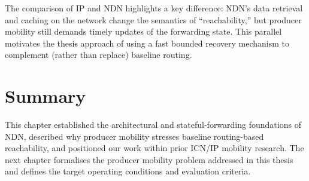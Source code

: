 The comparison of IP and NDN highlights a key difference: NDN’s data retrieval and caching on the network change the semantics of “reachability,” but producer mobility still demands timely updates of the forwarding state. This parallel motivates the thesis approach of using a fast bounded recovery mechanism to complement (rather than replace) baseline routing.


\section{Summary}
\label{sec:background:summary}

This chapter established the architectural and stateful-forwarding foundations of NDN, described why producer mobility stresses baseline routing-based reachability, and positioned our work within prior ICN/IP mobility research.
The next chapter formalises the producer mobility problem addressed in this thesis and defines the target operating conditions and evaluation criteria.

